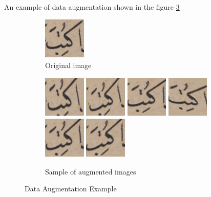 \noindent
An example of data augmentation shown in the figure \ref{fig:Data Augmentation Example}

\begin{figure}[!htb]
     \centering
     \begin{subfigure}[b]{0.2\textwidth}
         \centering
         \includegraphics[width=2cm, height=2cm]{images/original.png}
         \caption{Original image}
         \label{fig:Original image}
     \end{subfigure}
     \hfill
     \begin{subfigure}[b]{0.8\textwidth}
         \centering
            \includegraphics[width=2cm, height=2cm]{images/augmented_0.png}
            \includegraphics[width=2cm, height=2cm]{images/augmented_1.png}
            \includegraphics[width=2cm, height=2cm]{images/augmented_2.png}
            \includegraphics[width=2cm, height=2cm]{images/augmented_3.png}
            \includegraphics[width=2cm, height=2cm]{images/augmented_5.png}
            \includegraphics[width=2cm, height=2cm]{images/augmented_6.png}
         \caption{Sample of augmented images }
         \label{fig:Sample of augmented images}
     \end{subfigure}
        \caption{Data Augmentation Example}
        \label{fig:Data Augmentation Example}
\end{figure}

